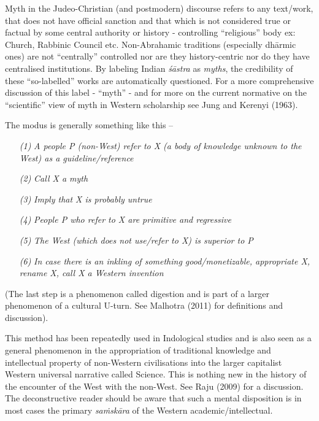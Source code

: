 \newpage

Myth in the Judeo-Christian (and postmodern) discourse refers to any text/work, that does not have official sanction and that which is not considered true or factual by some central authority or history - controlling ``religious'' body ex: Church, Rabbinic Council etc. Non-Abrahamic traditions (especially dhārmic ones) are not ``centrally'' controlled nor are they history-centric nor do they have centralised institutions. By labeling Indian {\sl śāstra} as {\sl myths}, the credibility of these ``so-labelled'' works are automatically questioned. For a more comprehensive discussion of this label -  ``myth'' - and for more on the current normative on the ``scientific'' view of myth in Western scholarship see Jung and Kerenyi (1963).

The modus is generally something like this --
\begin{itemize}
\itemsep=1pt
\item[{\sl(1)}] {\sl A people P (non-West) refer to X (a body of knowledge unknown to the West) as a guideline/reference}

\item[{\sl(2)}] {\sl Call X  a myth} 

\item[{\sl(3)}] {\sl Imply that X is probably untrue}

\item[{\sl(4)}] {\sl People P who refer to X are primitive and regressive}

\item[{\sl(5)}] {\sl The West (which does not use/refer to X) is superior to P}

\item[{\sl(6)}] {\sl In case there is an inkling of something good/monetizable, appropriate X, rename X, call X a Western invention} 
\end{itemize}

(The last step is a phenomenon called digestion and is part of a larger phenomenon of a cultural U-turn. See Malhotra (2011) for definitions and discussion).

This method has been repeatedly used in Indological studies and is also seen as a general phenomenon in the appropriation of traditional knowledge and intellectual property of non-Western civilisations into the larger capitalist Western universal narrative called Science. This is nothing new in the history of the encounter of the West with the non-West. See Raju (2009) for a discussion. The deconstructive reader should be aware that such a mental disposition is in most cases the primary {\sl saṁskāra} of the Western academic/intellectual.

